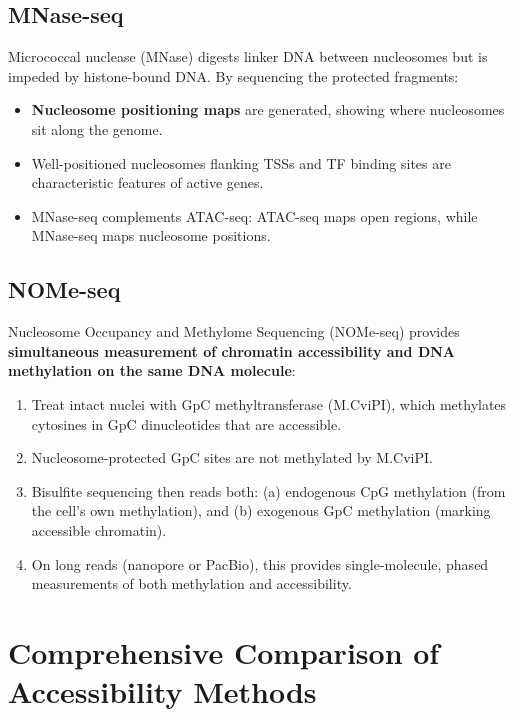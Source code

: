 \subsection{MNase-seq}
\label{subsec:chromatin:mnase}

Micrococcal nuclease (MNase) digests linker DNA between nucleosomes but is impeded by histone-bound DNA. By sequencing the protected fragments:

\begin{itemize}[itemsep=2pt]
  \item \textbf{Nucleosome positioning maps} are generated, showing where nucleosomes sit along the genome.
  \item Well-positioned nucleosomes flanking TSSs and TF binding sites are characteristic features of active genes.
  \item MNase-seq complements ATAC-seq: ATAC-seq maps open regions, while MNase-seq maps nucleosome positions.
\end{itemize}

\subsection{NOMe-seq}
\label{subsec:chromatin:nome}

Nucleosome Occupancy and Methylome Sequencing (NOMe-seq) provides \textbf{simultaneous measurement of chromatin accessibility and DNA methylation on the same DNA molecule}:

\begin{enumerate}[itemsep=2pt]
  \item Treat intact nuclei with GpC methyltransferase (M.CviPI), which methylates cytosines in GpC dinucleotides that are accessible.
  \item Nucleosome-protected GpC sites are not methylated by M.CviPI.
  \item Bisulfite sequencing then reads both: (a) endogenous CpG methylation (from the cell's own methylation), and (b) exogenous GpC methylation (marking accessible chromatin).
  \item On long reads (nanopore or PacBio), this provides single-molecule, phased measurements of both methylation and accessibility.
\end{enumerate}

\section{Comprehensive Comparison of Accessibility Methods}
\label{sec:chromatin:comparison}

